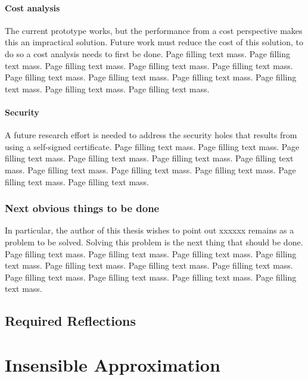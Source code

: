 \documentclass[12pt,a4paper,twoside,openright]{book}
\begin{document}
\subsubsection{Cost analysis}

The current prototype works, but the performance from a cost perspective makes
this an impractical solution. Future work must reduce the cost of this
solution, to do so a cost analysis needs to first be done. Page filling text
mass. Page filling text mass. Page filling text mass. Page filling text
mass. Page filling text mass. Page filling text mass. Page filling text
mass. Page filling text mass. Page filling text mass. Page filling text
mass. Page filling text mass.

\subsubsection{Security}

A future research effort is needed to address the security holes that results
from using a self-signed certificate. Page filling text mass. Page filling
text mass. Page filling text mass. Page filling text mass. Page filling text
mass. Page filling text mass. Page filling text mass. Page filling text
mass. Page filling text mass. Page filling text mass. Page filling text mass.


\subsection{Next obvious things to be done}

In particular, the author of this thesis wishes to point out xxxxxx remains as
a problem to be solved. Solving this problem is the next thing that should be
done. Page filling text mass. Page filling text mass. Page filling text
mass. Page filling text mass. Page filling text mass. Page filling text
mass. Page filling text mass. Page filling text mass. Page filling text
mass. Page filling text mass. Page filling text mass.

\section{Required Reflections}
\label{sec:req-reflections}




\appendix
\chapter{Insensible Approximation}

\backmatter
\end{document}
